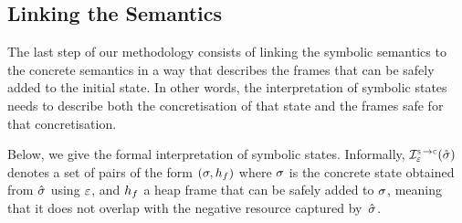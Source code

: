 \subsection{Linking the Semantics}\label{sex:formal:guarantees}

The last step of our methodology consists of linking the symbolic semantics to the concrete semantics in a way that describes the frames that can be safely added to the initial state.  
In other words, the interpretation of symbolic states needs to describe both the concretisation of that state and the frames safe for that concretisation. 

Below, we give the formal interpretation of symbolic states. Informally, 
$\interpret{\symbconc}{\senv}(\sstate)$ denotes a set of pairs of the form $(\sigma, h_f)$
where $\sigma$ is the concrete state obtained from $\hat{\sigma}$ using $\varepsilon$, and $h_f$ 
a heap frame that can be safely added to $\sigma$, meaning that it does not overlap with the negative resource captured by~$\hat{\sigma}$. 

\newcommand{\shorthand}{\sortstyle{I}}

